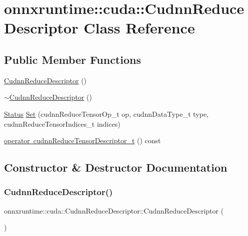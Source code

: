 \hypertarget{classonnxruntime_1_1cuda_1_1CudnnReduceDescriptor}{}\section{onnxruntime\+:\+:cuda\+:\+:Cudnn\+Reduce\+Descriptor Class Reference}
\label{classonnxruntime_1_1cuda_1_1CudnnReduceDescriptor}
\subsection*{Public Member Functions}
\begin{DoxyCompactItemize}
\item 
\mbox{\hyperlink{classonnxruntime_1_1cuda_1_1CudnnReduceDescriptor_abfd5dfce9f3dece85a9428aa37972939}{Cudnn\+Reduce\+Descriptor}} ()
\item 
\mbox{\hyperlink{classonnxruntime_1_1cuda_1_1CudnnReduceDescriptor_a6d1442eed7d6068bc9e3531dfb20d52b}{$\sim$\+Cudnn\+Reduce\+Descriptor}} ()
\item 
\mbox{\hyperlink{classonnxruntime_1_1common_1_1Status}{Status}} \mbox{\hyperlink{classonnxruntime_1_1cuda_1_1CudnnReduceDescriptor_a56b9645be4f70f4dd39fe3d8e6a1c337}{Set}} (cudnn\+Reduce\+Tensor\+Op\+\_\+t op, cudnn\+Data\+Type\+\_\+t type, cudnn\+Reduce\+Tensor\+Indices\+\_\+t indices)
\item 
\mbox{\hyperlink{classonnxruntime_1_1cuda_1_1CudnnReduceDescriptor_a266eb7b7a971ff60d0252e76de7096c3}{operator cudnn\+Reduce\+Tensor\+Descriptor\+\_\+t}} () const
\end{DoxyCompactItemize}


\subsection{Constructor \& Destructor Documentation}
\mbox{\label{classonnxruntime_1_1cuda_1_1CudnnReduceDescriptor_abfd5dfce9f3dece85a9428aa37972939}} 
\subsubsection{\texorpdfstring{Cudnn\+Reduce\+Descriptor()}{CudnnReduceDescriptor()}}
{\footnotesize\ttfamily onnxruntime\+::cuda\+::\+Cudnn\+Reduce\+Descriptor\+::\+Cudnn\+Reduce\+Descriptor (\begin{DoxyParamCaption}{ }\end{DoxyParamCaption})\hspace{0.3cm}{\ttfamily [inline]}}


